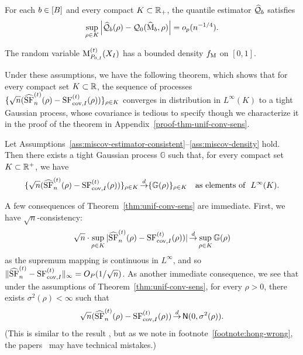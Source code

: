 \begin{assumption}
  \label{ass:miscov-quantile-estimator-consistent}
  For each $b \in [B]$ and every
  compact $K \subset \mathbb{R}_+$,
  the quantile estimator $\widehat{\mathcal{Q}}_b$ satisfies
  \begin{align*}
    \sup_{\rho \in K} \left| \widehat{\mathcal{Q}}_b(\rho) - \mathcal{Q}_0(\widehat{\operatorname*{M}}_b, \rho)\right| = o_p(n^{-1/4}).
  \end{align*}
\end{assumption}

\begin{assumption}
\label{ass:miscov-density}
The random variable ${\operatorname*{M}}_{P_{0,I}}^{(t)}(X_I)$ has a bounded density $f_{\operatorname*{M}}$ on $[0,1]$.
\end{assumption}

Under these assumptions, we have the following
theorem, which shows that for every compact set $K \subset \mathbb{R}$, the sequence of
processes $\{ \sqrt{n}(\widehat{\operatorname*{SF}}^{(t)}_n(\rho)-
{\operatorname*{SF}}_{\textup{cov}, I}^{(t)}(\rho)) \}_{\rho \in K}$ converges in distribution in $L^\infty(K)$ to
a tight Gaussian process, whose covariance is tedious to specify
though we characterize it in the proof of the theorem in
Appendix~\ref{proof-thm-unif-conv-sens}.
\begin{theorem}
  \label{thm:unif-conv-sens}
  Let
  Assumptions~\ref{ass:miscov-estimator-consistent}--\ref{ass:miscov-density}
  hold. Then there exists a tight Gaussian process $\mathbb{G}$ such that,
  for every compact set $K \subset \mathbb{R}^+$, we have
  \begin{align*}
    \{ \sqrt{n}(\widehat{\operatorname*{SF}}^{(t)}_n(\rho)- {\operatorname*{SF}}_{\textup{cov}, I}^{(t)}(\rho)) \}_{\rho \in K}
    \mathop{\stackrel{d}{\rightarrow}}
    \{ \mathbb{G}(\rho) \}_{\rho \in K}
    ~~~ \mbox{as~elements~of~~}L^\infty(K).
  \end{align*}
\end{theorem}

A few consequences of Theorem~\ref{thm:unif-conv-sens} are immediate.
First, we have $\sqrt{n}$-consistency:
\begin{align*}
  \sqrt{n} \cdot
  \sup_{\rho \in K}|\widehat{\operatorname*{SF}}^{(t)}_n(\rho)- {\operatorname*{SF}}_{\textup{cov}, I}^{(t)}(\rho))|
  \mathop{\stackrel{d}{\rightarrow}} \sup_{\rho \in K} \mathbb{G}(\rho)
\end{align*}
as the supremum mapping is continuous in $L^\infty$, and so
$\|{\widehat{\operatorname*{SF}}^{(t)}_n - {\operatorname*{SF}}_{\textup{cov}, I}^{(t)}}\|_\infty = O_P(1/\sqrt{n})$. As another
immediate consequence, we see that under the assumptions of
Theorem~\ref{thm:unif-conv-sens},
for every $\rho >0$, there exists $\sigma^2(\rho) < \infty$ such that
\begin{align*}
  \sqrt{n}(\widehat{\operatorname*{SF}}^{(t)}_n(\rho)- {\operatorname*{SF}}_{\textup{cov}, I}^{(t)}(\rho)) \mathop{\stackrel{d}{\rightarrow}}
   \mathsf{N}(0,\sigma^2(\rho)).
\end{align*}
(This is similar to the result \cite[Thm.~1]{SubbaswamyAdSa21},
but as we note in footnote~\ref{footnote:hong-wrong},
the papers~\cite{SubbaswamyAdSa21,JeongNa20} may have technical
mistakes.)
